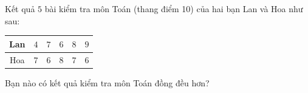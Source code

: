 \begin{ex}
Kết quả $5$ bài kiểm tra môn Toán (thang điểm 10) của hai bạn Lan và Hoa như sau:
\begin{center}
\begin{tabular}{|c|c|c|c|c|c|}\hline
Lan & $4$ & $7$ & $6$ & $8$ & $9$\\\hline
Hoa & $7$ & $6$ & $8$ & $7$ & $6$\\\hline
\end{tabular}
\end{center}
Bạn nào có kết quả kiểm tra môn Toán đồng đều hơn?
\end{ex}

